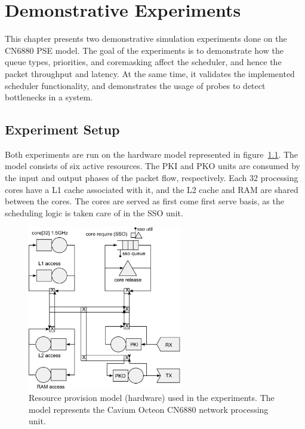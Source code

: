 \chapter{Demonstrative Experiments}
\label{chapter:demonstrative-experiments}

This chapter presents two demonstrative simulation experiments done on the CN6880 PSE model. The goal of the experiments is to demonstrate how the queue types, priorities, and coremasking affect the scheduler, and hence the packet throughput and latency. At the same time, it validates the implemented scheduler functionality, and demonstrates the usage of probes to detect bottlenecks in a system.

\section{Experiment Setup}
\label{sec:experiment-setup}

Both experiments are run on the hardware model represented in figure~\ref{fig:experiment-hardware}. The model consists of six active resources. The PKI and PKO units are consumed by the input and output phases of the packet flow, respectively. Each 32 processing cores have a L1 cache associated with it, and the L2 cache and RAM are shared between the cores. The cores are served as first come first serve basis, as the scheduling logic is taken care of in the SSO unit.

\begin{figure}[]
  \begin{center}
    \includegraphics[width=0.6\textwidth]{images/pse-models/experiment-hardware.pdf}
    \caption{Resource provision model (hardware) used in the experiments. The model represents the Cavium Octeon CN6880 network processing unit.}
    \label{fig:experiment-hardware}
  \end{center}
\end{figure}

